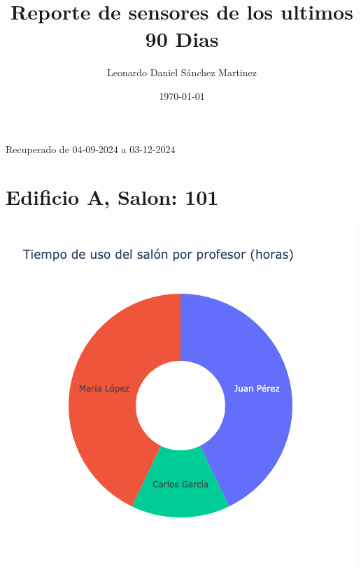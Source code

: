 \documentclass{article}
\title{Reporte de sensores de los ultimos 90 Dias}
\author{Leonardo Daniel Sánchez Martinez}
\date{\today}
\begin{document}
    \maketitle
    Recuperado de 04-09-2024 a 03-12-2024

    \section{Edificio A, Salon: 101}
    \noindent
    \begin{minipage}{0.48\textwidth}
        \centering
        \includegraphics[width=\textwidth]{../img/pie/UP101-90Dias-03-12-2024.png}
    \end{minipage}
    \hfill
\end{document}
